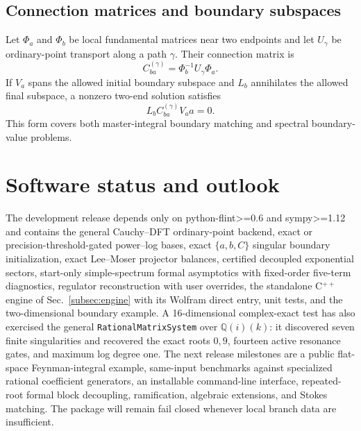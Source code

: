 \documentclass[11pt]{article}
\begin{document}
\subsection{Connection matrices and boundary subspaces}

Let $\Phi_a$ and $\Phi_b$ be local fundamental matrices near two endpoints and let
$U_\gamma$ be ordinary-point transport along a path $\gamma$.  Their connection matrix is
\begin{equation}
  C_{ba}^{(\gamma)}=\Phi_b^{-1}U_\gamma\Phi_a.
\end{equation}
If $V_a$ spans the allowed initial boundary subspace and $L_b$ annihilates the allowed final
subspace, a nonzero two-end solution satisfies
\begin{equation}
  L_b C_{ba}^{(\gamma)}V_a a=0.
  \label{eq:two-end-condition}
\end{equation}
This form covers both master-integral boundary matching and spectral boundary-value
problems.

\section{Software status and outlook}

The development release depends only on python-flint>=0.6 and sympy>=1.12 and contains the general Cauchy--DFT
ordinary-point backend, exact or precision-threshold-gated power--log bases, exact
$\{a,b,C\}$ singular boundary initialization, exact Lee--Moser projector balances,
certified decoupled exponential sectors, start-only simple-spectrum formal asymptotics with
fixed-order five-term diagnostics, regulator reconstruction with user overrides, the
standalone C$^{++}$ engine of Sec.~\ref{subsec:engine} with its Wolfram direct entry,
unit tests, and the
two-dimensional boundary example.  A 16-dimensional complex-exact test has also exercised
the general \texttt{Rational}\allowbreak\texttt{Matrix}\allowbreak\texttt{System} over
$\mathbb Q(i)(k)$: it
discovered seven finite
singularities and recovered the exact roots $0,9$, fourteen active resonance gates, and
maximum log degree one.  The next release milestones are a public flat-space
Feynman-integral example, same-input benchmarks against specialized rational coefficient
generators, an installable command-line interface, repeated-root formal block decoupling,
ramification, algebraic extensions, and Stokes matching.  The package will remain fail
closed whenever local branch data are insufficient.

\enlargethispage{1.5\baselineskip}


\end{document}
